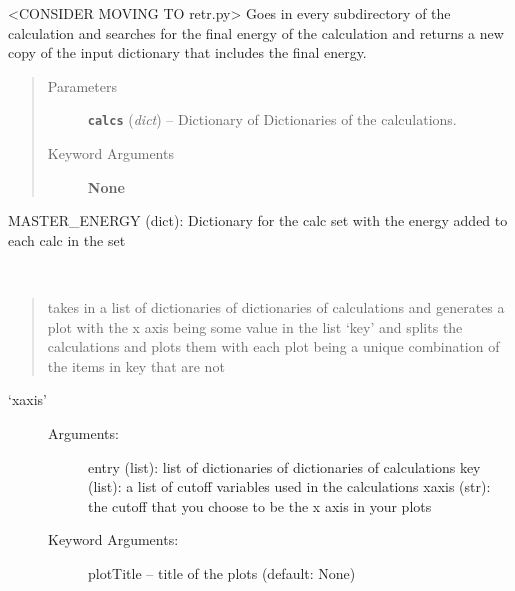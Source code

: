 \documentclass[letterpaper,10pt,english]{sphinxmanual}
\begin{document}

\begin{fulllineitems}
\label{pseudo:pseudo.__grabEnergyOut}
\textless{}CONSIDER MOVING TO retr.py\textgreater{}
Goes in every subdirectory of the calculation and searches for the final energy of the calculation
and returns a new copy of the input dictionary that includes the final energy.
\begin{quote}\begin{description}
\item[{Parameters}] \leavevmode
\textbf{\texttt{calcs}} (\emph{dict}) -- Dictionary of Dictionaries of the calculations.

\item[{Keyword Arguments}] \leavevmode
\textbf{None}

\end{description}\end{quote}

MASTER\_ENERGY (dict): Dictionary for the calc set with the energy added to each calc in the set

\end{fulllineitems}


\begin{fulllineitems}
\label{pseudo:pseudo.__plotOne}~\begin{quote}

takes in a list of dictionaries of dictionaries of calculations and generates
a plot with the x axis being some value in the list `key' and splits the calculations
and plots them with each plot being a unique combination of the items in key that are not
\end{quote}
\begin{description}
\item[{`xaxis'}] \leavevmode\begin{description}
\item[{Arguments:}] \leavevmode
entry (list): list of dictionaries of dictionaries of calculations
key (list): a list of cutoff variables used in the calculations
xaxis (str): the cutoff that you choose to be the x axis in your plots

\item[{Keyword Arguments:}] \leavevmode
plotTitle -- title of the plots (default: None)

\end{description}

\end{description}

\end{fulllineitems}
\end{document}
